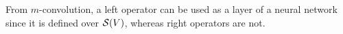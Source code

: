 



From $m$-convolution, a left operator can be used as a layer of a neural network since it is defined over $\mathcal{S}(V)$, whereas right operators are not. 


